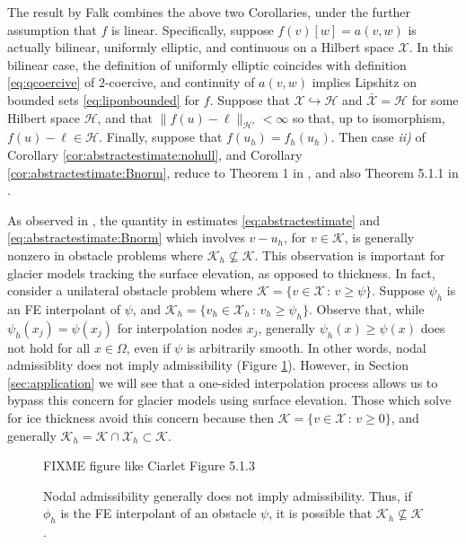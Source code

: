 \documentclass[hidelinks,onefignum,onetabnum,final]{siamart220329}  %
\newcommand{\cH}{\mathcal{H}}
\newcommand{\cK}{\mathcal{K}}
\newcommand{\cX}{\mathcal{X}}
\begin{document}
The result by Falk \cite{Falk1974} combines the above two Corollaries, under the further assumption that $f$ is linear.  Specifically, suppose $f(v)[w]=a(v,w)$ is actually bilinear, uniformly elliptic, and continuous on a Hilbert space $\cX$.  In this bilinear case, the definition of uniformly elliptic coincides with definition \eqref{eq:qcoercive} of $2$-coercive, and continuity of $a(v,w)$ implies Lipshitz on bounded sets \eqref{eq:liponbounded} for $f$.  Suppose that $\cX\hookrightarrow \cH$ and $\bar{\cX} = \cH$ for some Hilbert space $\cH$, and that $\|f(u)-\ell\|_{\cH'} < \infty$ so that, up to isomorphism, $f(u)-\ell \in \cH$.  Finally, suppose that $f(u_h)=f_h(u_h)$.  Then case \emph{ii)} of Corollary \ref{cor:abstractestimate:nohull}, and Corollary \ref{cor:abstractestimate:Bnorm}, reduce to Theorem 1 in \cite{Falk1974}, and also Theorem 5.1.1 in \cite{Ciarlet2002}.

As observed in \cite{Ciarlet2002}, the quantity in estimates \eqref{eq:abstractestimate} and \eqref{eq:abstractestimate:Bnorm} which involves $v-u_h$, for $v\in\cK$, is generally nonzero in obstacle problems where $\cK_h \nsubseteq \cK$.  This observation is important for glacier models tracking the surface elevation, as opposed to thickness.  In fact, consider a unilateral obstacle problem where $\cK=\{v \in \cX\,:\,v\ge \psi\}$.  Suppose $\psi_h$ is an FE interpolant of $\psi$, and $\cK_h=\{v_h \in \cX_h\,:\,v_h\ge \psi_h\}$.  Observe that, while $\psi_h(x_j)=\psi(x_j)$ for interpolation nodes $x_j$, generally $\psi_h(x) \ge \psi(x)$ does not hold for all $x\in\Omega$, even if $\psi$ is arbitrarily smooth.  In other words, nodal admissiblity does not imply admissibility (Figure \ref{fig:nonadmissible}).  However, in Section \ref{sec:application} we will see that a one-sided interpolation process allows us to bypass this concern for glacier models using surface elevation.  Those which solve for ice thickness avoid this concern because then $\cK = \{v\in\cX\,:\,v\ge 0\}$, and generally $\cK_h=\cK\cap\cX_h \subset \cK$.

\begin{figure}[ht]
\begin{center}
FIXME figure like Ciarlet Figure 5.1.3 %
\end{center}
\caption{Nodal admissibility generally does not imply admissibility.  Thus, if $\phi_h$ is the FE interpolant of an obstacle $\psi$, it is possible that $\cK_h \nsubseteq \cK$.}
\label{fig:nonadmissible}
\end{figure}
\end{document}
